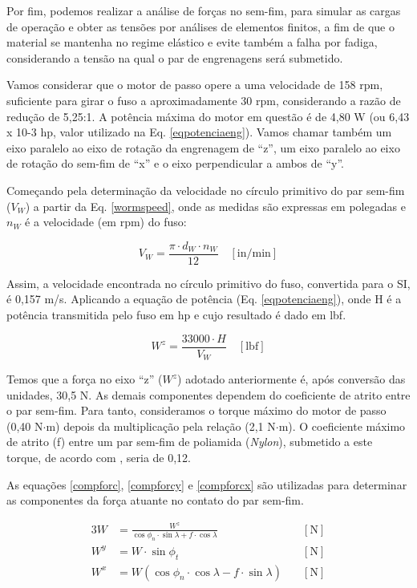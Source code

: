 Por fim, podemos realizar a análise de forças no sem-fim, para simular as cargas de operação e obter as tensões por análises de elementos finitos, a fim de que o material se mantenha no regime elástico e evite também a falha por fadiga, considerando a tensão na qual o par de engrenagens será submetido.

Vamos considerar que o motor de passo opere a uma velocidade de 158 rpm, suficiente para girar o fuso a aproximadamente 30 rpm, considerando a razão de redução de 5,25:1. A potência máxima do motor em questão é de 4,80 W (ou 6,43 x 10-3 hp, valor utilizado na Eq. \ref{eqpotenciaeng}). Vamos chamar também um eixo paralelo ao eixo de rotação da engrenagem de “z”, um eixo paralelo ao eixo de rotação do sem-fim de “x” e o eixo perpendicular a ambos de “y”.

Começando pela determinação da velocidade no círculo primitivo do par sem-fim ($V_W$) a partir da Eq. \ref{wormspeed}, onde as medidas são expressas em polegadas e $n_W$ é a velocidade (em rpm) do fuso:

\begin{equation}
    \label{wormspeed}
    V_W = \frac{\pi \cdot d_W \cdot n_W}{12} \quad [\text{in/min}]
\end{equation}

Assim, a velocidade encontrada no círculo primitivo do fuso, convertida para o SI, é 0,157 m/s. Aplicando a equação de potência (Eq. \ref{eqpotenciaeng}), onde H é a potência transmitida pelo fuso em hp e cujo resultado é dado em lbf.

\begin{equation}
    \label{eqpotenciaeng}
    W^z = \frac{33000 \cdot H}{V_W} \quad [\text{lbf}]
\end{equation}

Temos que a força no eixo “z” ($W^z$) adotado anteriormente é, após conversão das unidades, 30,5 N. As demais componentes dependem do coeficiente de atrito entre o par sem-fim. Para tanto, consideramos o torque máximo do motor de passo (0,40 N$\cdot$m) depois da multiplicação pela relação (2,1 N$\cdot$m). O coeficiente máximo de atrito (f) entre um par sem-fim de poliamida (\textit{Nylon}), submetido a este torque, de acordo com \cite{starzhinsky2013}, seria de 0,12. 

As equações \ref{compforc},  \ref{compforcy} e \ref{compforcx} são utilizadas para determinar as componentes da força atuante no contato do par sem-fim.

\begin{alignat}{3}
    \label{compforc}
    W & = \frac{W^z}{\cos{\phi_n}\cdot\sin{\lambda}+f\cdot \cos{\lambda}} & \quad [\text{N}] \\
    \label{compforcy}
    W^y & = W \cdot \sin{\phi_t} & \quad [\text{N}] \\
    \label{compforcx}
    W^x & = W (\cos{\phi_n} \cdot \cos{\lambda} - f \cdot \sin{\lambda}) & \quad [\text{N}]
\end{alignat}

